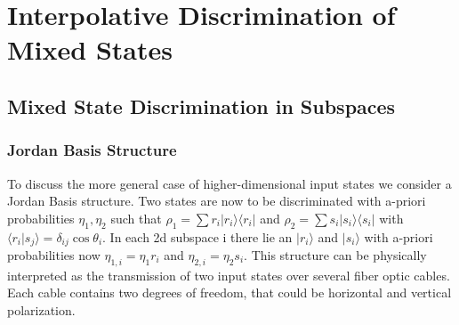 \documentclass[12pt,oneside,english,reqno]{amsbook}
\numberwithin{section}{chapter}
\numberwithin{equation}{section}
\numberwithin{figure}{section}
\begin{document}



\part{Interpolative Discrimination of Mixed States}


\chapter{Mixed State Discrimination in Subspaces}


\section{Jordan Basis Structure}
To discuss the more general case of higher-dimensional input states we consider a Jordan Basis structure.
Two states are now to be discriminated with a-priori probabilities $\eta_1 , \eta_2$ such that $\rho_1 = \sum r_i \vert r_i \rangle \langle r_i \vert $ and $\rho_2 = \sum s_i \vert s_i \rangle \langle s_i \vert$ with $ \langle r_i \vert s_j \rangle = \delta_{ij} \cos \theta_i$. In each 2d subspace i there lie an $\vert r_i \rangle$ and  $\vert s_i \rangle$ with a-priori probabilities now
$\eta_{1,i} = \eta_1 r_i$ and $\eta_{2,i} = \eta_2 s_i$.  This structure can be physically interpreted as the transmission of two input states over several fiber optic cables. Each cable contains two degrees of freedom, that could be horizontal and vertical polarization.
\end{document}

